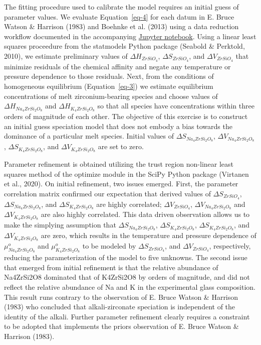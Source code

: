 \documentclass[
]{agujournal2019}
\begin{document}
The fitting procedure used to calibrate the model requires an initial
guess of parameter values. We evaluate Equation~\ref{eq-4} for each
datum in E. Bruce Watson \& Harrison (1983) and Boehnke et al. (2013)
using a data reduction workflow documented in the accompanying
\href{./notebooks/6-Liquid-MELTS-calib-2.ipynb}{Jupyter notebook}. Using
a linear least squares proceedure from the statmodels Python package
(Seabold \& Perktold, 2010), we estimate preliminary values of
\(\Delta H_{ZrSiO_4}\), \(\Delta S_{ZrSiO_4}\), and
\(\Delta V_{ZrSiO_4}\) that minimize residuals of the chemical affinity
and negate any temperature or pressure dependence to those residuals.
Next, from the conditions of homogeneous equilibrium
(Equation~\ref{eq-3}) we estimate equilibrium concentrations of melt
zirconium-bearing species and choose values of
\(\Delta H_{Na_4ZrSi_2O_8}\) and \(\Delta H_{K_4ZrSi_2O_8}\) so that all
species have concentrations within three orders of magnitude of each
other. The objective of this exercise is to construct an initial guess
speciation model that does not embody a bias towards the dominance of a
particular melt species. Initial values of \(\Delta S_{Na_4ZrSi_2O_8}\),
\(\Delta V_{Na_4ZrSi_2O_8}\), \(\Delta S_{K_4ZrSi_2O_8}\), and
\(\Delta V_{K_4ZrSi_2O_8}\) are set to zero.

Parameter refinement is obtained utilizing the trust region non-linear
least squares method of the optimize module in the SciPy Python package
(Virtanen et al., 2020). On initial refinement, two issues emerged.
First, the parameter correlation matrix confirmed our expectation that
derived values of \(\Delta S_{ZrSiO_4}\), \(\Delta S_{Na_4ZrSi_2O_8}\),
and \(\Delta S_{K_4ZrSi_2O_8}\) are highly correlated;
\(\Delta V_{ZrSiO_4}\), \(\Delta V_{Na_4ZrSi_2O_8}\) and
\(\Delta V_{K_4ZrSi_2O_8}\) are also highly correlated. This data driven
observation allows us to make the simplying assumption that
\(\Delta S_{Na_4ZrSi_2O_8}\), \(\Delta S_{K_4ZrSi_2O_8}\),
\(\Delta S_{K_4ZrSi_2O_8}\), and \(\Delta V_{K_4ZrSi_2O_8}\) are zero,
which results in the temperature and pressure dependence of
\(\mu_{Na_4ZrSi_2O_8}^{o}\) and \(\mu_{K_4ZrSi_2O_8}^{o}\) to be modeled
by \(\Delta S_{ZrSiO_4}\), and \(\Delta V_{ZrSiO_4}\), respectively,
reducing the parameterization of the model to five unknowns. The second
issue that emerged from initial refinement is that the relative
abundance of Na4ZrSi2O8 dominated that of K4ZrSi2O8 by orders of
magnitude, and did not reflect the relative abundance of Na and K in the
experimental glass composition. This result runs contrary to the
observation of E. Bruce Watson \& Harrison (1983) who concluded that
alkali-zirconate speciation is independent of the identity of the
alkali. Further parameter refinement clearly requires a constraint to be
adopted that implements the priors observation of E. Bruce Watson \&
Harrison (1983).
\end{document}
